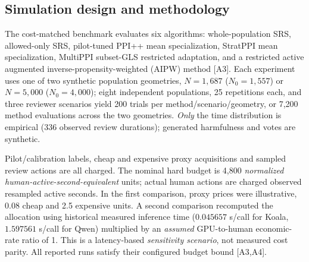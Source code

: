 \documentclass[11pt,a4paper]{article}
\begin{document}
\subsection{Simulation design and methodology}
The cost-matched benchmark evaluates six algorithms: whole-population SRS, allowed-only SRS, pilot-tuned PPI++ mean specialization, StratPPI mean specialization, MultiPPI subset-GLS restricted adaptation, and a restricted active augmented inverse-propensity-weighted (AIPW) method [A3]. Each experiment uses one of two synthetic population geometries, $N=1{,}687$ ($N_0=1{,}557$) or $N=5{,}000$ ($N_0=4{,}000$); eight independent populations, 25 repetitions each, and three reviewer scenarios yield 200 trials per method/scenario/geometry, or 7,200 method evaluations across the two geometries. \emph{Only} the time distribution is empirical (336 observed review durations); generated harmfulness and votes are synthetic.

Pilot/calibration labels, cheap and expensive proxy acquisitions and sampled review actions are all charged. The nominal hard budget is 4,800 \emph{normalized human-active-second-equivalent} units; actual human actions are charged observed resampled active seconds. In the first comparison, proxy prices were illustrative, 0.08 cheap and 2.5 expensive units. A second comparison recomputed the allocation using historical measured inference time ($0.045657$ s/call for Koala, $1.597561$ s/call for Qwen) multiplied by an \emph{assumed} GPU-to-human economic-rate ratio of 1. This is a latency-based \emph{sensitivity scenario}, not measured cost parity. All reported runs satisfy their configured budget bound [A3,A4].
\end{document}
